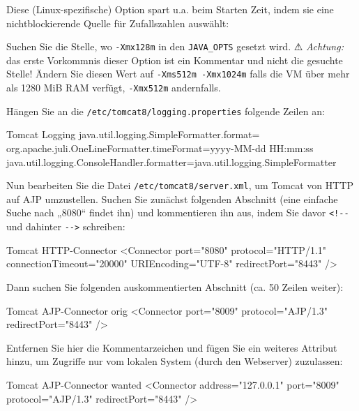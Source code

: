 \begin{minipage}{\linewidth}
Diese (Linux-spezifische) Option spart u.a. beim Starten Zeit,
indem sie eine nichtblockierende Quelle für Zufallszahlen auswählt:

\end{minipage}

Suchen Sie die Stelle, wo \texttt{-Xmx128m} in den \texttt{JAVA\_OPTS}
gesetzt wird. ⚠ \emph{Achtung:} das erste Vorkommnis dieser
Option ist ein Kommentar und nicht die gesuchte Stelle! Ändern Sie
diesen Wert auf \texttt{-Xms512m -Xmx1024m} falls die VM über mehr
als 1280 MiB RAM verfügt, \texttt{-Xmx512m} andernfalls.

\begin{minipage}{\linewidth}
Hängen Sie an die \texttt{/etc/tomcat8/logging.properties} folgende
Zeilen an:

\begin{lstdump}[breaklines=false]{Tomcat Logging}
java.util.logging.SimpleFormatter.format=%
org.apache.juli.OneLineFormatter.timeFormat=yyyy-MM-dd HH:mm:ss
java.util.logging.ConsoleHandler.formatter=java.util.logging.SimpleFormatter
\end{lstdump}
\end{minipage}

\begin{minipage}{\linewidth}
Nun bearbeiten Sie die Datei \texttt{/etc/tomcat8/server.xml}, um Tomcat
von HTTP auf AJP umzustellen. Suchen Sie zunächst folgenden Abschnitt
(eine einfache Suche nach „8080“ findet ihn) und kommentieren ihn aus,
indem Sie davor \texttt{<!‑‑} und dahinter \texttt{‑‑>} schreiben:

\begin{lstdump}[language=XML]{Tomcat HTTP-Connector}
<Connector port="8080" protocol="HTTP/1.1"
           connectionTimeout="20000"
           URIEncoding="UTF-8"
           redirectPort="8443" />
\end{lstdump}
\end{minipage}

\begin{minipage}{\linewidth}
Dann suchen Sie folgenden auskommentierten Abschnitt (ca. 50 Zeilen weiter):

\begin{lstdump}[language=XML]{Tomcat AJP-Connector orig}
<Connector port="8009" protocol="AJP/1.3" redirectPort="8443" />
\end{lstdump}

Entfernen Sie hier die Kommentarzeichen und fügen Sie ein weiteres Attribut
hinzu, um Zugriffe nur vom lokalen System (durch den Webserver) zuzulassen:

\begin{lstdump}[language=XML]{Tomcat AJP-Connector wanted}
<Connector address="127.0.0.1" port="8009" protocol="AJP/1.3" redirectPort="8443" />
\end{lstdump}
\end{minipage}

